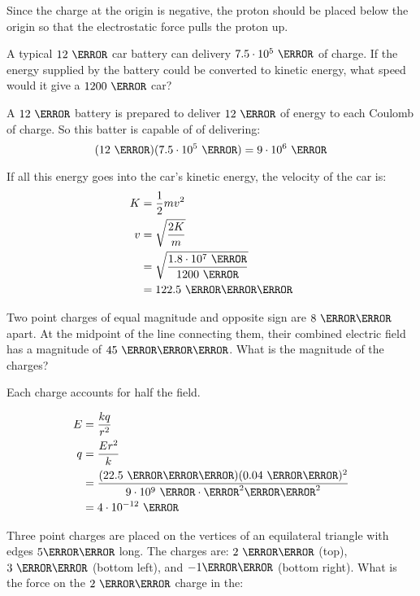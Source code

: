 \documentclass[fleqn,addpoints]{exam}
\begin{document}
\begin{questions}
\begin{solution}
Since the charge at the origin is negative, the proton should be placed below the origin so that the electrostatic force pulls the proton up.

\end{solution}

\bonusquestion[5]
A typical $12 \ \volt$ car battery can delivery $7.5 \cdot 10^5 \ \coulomb$ of charge.  If the energy supplied by the
battery could be converted to kinetic energy, what speed would it give a $1200 \ \kilogram$ car?

\begin{solution}
A $12 \ \volt$ battery is prepared to deliver $12 \ \joule$ of energy to each Coulomb of charge.  So this batter is
capable of of delivering:
\[
  (12 \ \volt)(7.5 \cdot 10^5 \ \coulomb) = 9 \cdot 10^6 \ \joule
\]

If all this energy goes into the car's kinetic energy, the velocity of the car is:
\begin{align*}
  K &= \frac{1}{2} mv^2 \\
  v &= \sqrt{\frac{2K}{m}} \\
    &= \sqrt{\frac{1.8 \cdot 10^7 \ \joule}{1200 \ \kilogram}} \\
    &= 122.5 \ \meter \per \second \\
\end{align*}

\end{solution}

\question[5] Two point charges of equal magnitude and opposite sign are $8 \ \centi \meter$ apart.  At the midpoint
of the line connecting them, their combined electric field has a magnitude of $45 \ \newton \per \coulomb$.  What is the
magnitude of the charges?

Each charge accounts for half the field.

\begin{solution}
\begin{align*}
  E &= \frac{kq}{r^2} \\
  q &= \frac{Er^2}{k} \\
    &= \frac{(22.5 \ \newton \per \coulomb)(0.04 \ \centi \meter)^2}
            {9 \cdot 10^9 \ \newton \cdot \meter^2 \per \coulomb^2} \\
    &= 4 \cdot 10^{-12} \ \coulomb \\
\end{align*}
\end{solution}

\bonusquestion Three point charges are placed on the vertices of an equilateral triangle with edges $5 \centi\meter$
long.  The charges are: $2 \ \micro\coulomb$ (top), $3 \ \micro\coulomb$ (bottom left), and $-1 \micro \coulomb$ (bottom
right).  What is the force on the $2 \ \micro\coulomb$ charge in the:


\end{questions}
\end{document}
